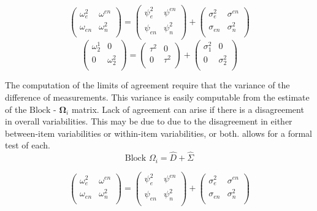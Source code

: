 \documentclass[12pt, a4paper]{report}
\theoremstyle{plain}
\theoremstyle{definition}
\theoremstyle{remark}
\begin{document}
\begin{equation}
\left( \begin{array}{cc}
\omega^2_{e} & \omega^{en} \\
\omega_{en} & \omega^2_{n} \\
\end{array}\right)
=
\left( \begin{array}{cc}
\psi^2_{e} & \psi^{en} \\
\psi_{en} & \psi^2_{n} \\
\end{array}\right)
+
\left( \begin{array}{cc}
\sigma^2_{e} & \sigma^{en} \\
\sigma_{en} & \sigma^2_{n} \\
\end{array}\right)
\end{equation}
\[\left(\begin{array}{cc}
\omega^1_2  & 0 \\
0 & \omega^2_2 \\
\end{array}  \right)
=  \left(
\begin{array}{cc}
\tau^2  & 0 \\
0 & \tau^2 \\
\end{array} \right)+
\left(
\begin{array}{cc}
\sigma^2_1  & 0 \\
0 & \sigma^2_2 \\
\end{array}\right)
\]

The computation of the limits of agreement require that the variance of the difference of measurements. This variance is easily computable from the estimate of the ${\mbox{Block - }\boldsymbol \Omega_{i}}$ matrix. Lack of agreement can arise if there is a disagreement in overall variabilities. This may be due to due to the disagreement in either between-item
variabilities or within-item variabilities, or both. \citet{ARoy2009} allows for a formal test of each.
\begin{equation}
\mbox{Block  }\Omega_{i} = \hat{D} + \hat{\Sigma}
\end{equation}

\begin{equation}
\left( \begin{array}{cc}
\omega^2_{e} & \omega^{en} \\
\omega_{en} & \omega^2_{n} \\
\end{array}\right)
=
\left( \begin{array}{cc}
\psi^2_{e} & \psi^{en} \\
\psi_{en} & \psi^2_{n} \\
\end{array}\right)
+
\left( \begin{array}{cc}
\sigma^2_{e} & \sigma^{en} \\
\sigma_{en} & \sigma^2_{n} \\
\end{array}\right)
\end{equation}
\end{document}
